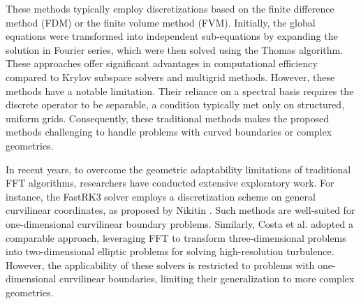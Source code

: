 \documentclass[preprint]{elsarticle}
\begin{document}
These methods typically employ discretizations based on the finite difference method (FDM) or the finite volume method (FVM)\cite{han2025convergent, coco2024high, liu2025sixth}. Initially, the global equations were transformed into independent sub-equations by expanding the solution in Fourier series, which were then solved using the Thomas algorithm. These approaches offer significant advantages in computational efficiency compared to Krylov subspace solvers and multigrid methods. However, these methods have a notable limitation. Their reliance on a spectral basis requires the discrete operator to be separable, a condition typically met only on structured, uniform grids. Consequently, these traditional methods makes the proposed methods challenging to handle problems with curved boundaries or complex geometries.

In recent years, to overcome the geometric adaptability limitations of traditional FFT algorithms, researchers have conducted extensive exploratory work. For instance, the FastRK3 solver \cite{aithal2020fast} employs a discretization scheme on general curvilinear coordinates, as proposed by Nikitin \cite{nikitin2006finite}. Such methods are well-suited for one-dimensional curvilinear boundary problems. Similarly, Costa et al. \cite{costa2022fft, wang2023fft} adopted a comparable approach, leveraging FFT to transform three-dimensional problems into two-dimensional elliptic problems for solving high-resolution turbulence. However, the applicability of these solvers is restricted to problems with one-dimensional curvilinear boundaries, limiting their generalization to more complex geometries.

\end{document}

